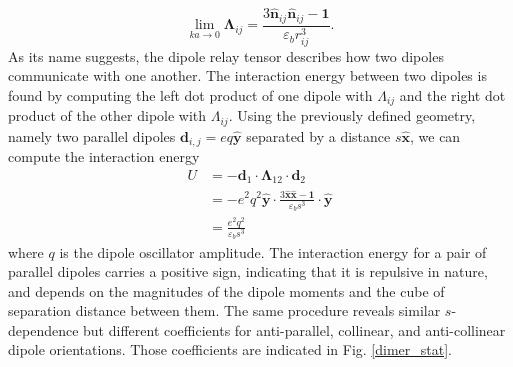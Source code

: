 \documentclass [11pt, proquest] {uwthesis}[2016/11/22]
\begin{document}
\begin{equation}
\lim_{ka \to 0}\boldsymbol{\Lambda}_{ij} =  \frac{3\hat{\textbf{n}}_{ij}\hat{\textbf{n}}_{ij} - \textbf{1}}{\varepsilon_br_{ij}^3}.
\end{equation}
As its name suggests, the dipole relay tensor describes how two dipoles communicate with one another. The interaction energy between two dipoles is found by computing the left dot product of one dipole with $\Lambda_{ij}$ and the right dot product of the other dipole with $\Lambda_{ij}$. Using the previously defined geometry, namely two parallel dipoles $\textbf{d}_{i,j} = eq\hat{\textbf{y}}$ separated by a distance $s\hat{\textbf{x}}$, we can compute the interaction energy
\begin{equation}
\begin{split}
U &= -\textbf{d}_1\cdot\boldsymbol{\Lambda}_{12}\cdot\textbf{d}_2\\
&= -e^2q^2\hat{\textbf{y}}\cdot\frac{3\hat{\textbf{x}}\hat{\textbf{x}} - \textbf{1}}{\varepsilon_bs^3}\cdot\hat{\textbf{y}}\\
&= \frac{e^2q^2}{\varepsilon_bs^3}
\label{quasi_int}
\end{split}
\end{equation}
where $q$ is the dipole oscillator amplitude. The interaction energy for a pair of parallel dipoles carries a positive sign, indicating that it is repulsive in nature, and depends on the magnitudes of the dipole moments and the cube of separation distance between them. The same procedure reveals similar $s$-dependence but different coefficients for anti-parallel, collinear, and anti-collinear dipole orientations. Those coefficients are indicated in Fig. \ref{dimer_stat}.
\end{document}
